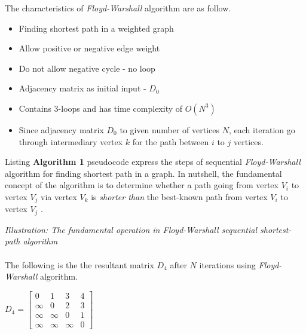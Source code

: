 \documentclass[dareport.tex]{subfiles}
\begin{document}
The characteristics of \emph{Floyd-Warshall} algorithm are as follow.
\begin{itemize}
\item Finding shortest path in a weighted graph
\item Allow positive or negative edge weight
\item Do not allow negative cycle - no loop
\item Adjacency matrix as initial input - $D_{0}$
\item Contains 3-loops and has time complexity of $O(N^{3})$
\item Since adjacency matrix $D_{0}$ to given number of vertices $N$, each iteration go through intermediary vertex $k$ for the path between $i$ to $j$ vertices.
\end{itemize}
Listing \textbf{Algorithm 1} pseudocode express the steps of sequential \emph{Floyd-Warshall} algorithm for finding shortest path in a graph. In nutshell, the fundamental concept of the algorithm is to determine whether a path going from vertex $V_{i}$ to vertex $V_{j}$ via vertex $V_{k}$ is \textit{shorter than} the best-known path from vertex $V_{i}$ to vertex $V_{j}$ \cite{foster}.

\begin{center}
\end{center}

\textit{Illustration: The fundamental operation in Floyd-Warshall sequential shortest-path algorithm
}
\\
\\
The following is the the resultant matrix $D_{4}$ after $N$ iterations using \emph{Floyd-Warshall} algorithm.

\begin{center}
$D_{4} = \begin{bmatrix}
        0 & 1 & 3 & 4 \\
       	\infty & 0 & 2 & 3 \\
       	\infty & \infty & 0 & 1 \\
       	\infty & \infty & \infty & 0
       	\end{bmatrix}$

\end{center}
\end{document}

